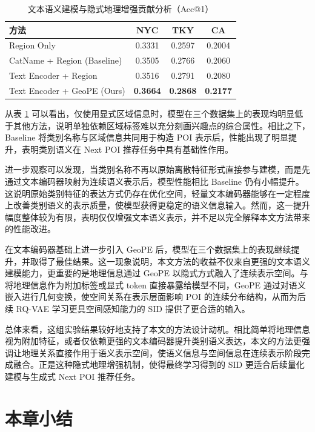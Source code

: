 \begin{table}[htbp]
\centering
\caption{文本语义建模与隐式地理增强贡献分析（Acc@1）}
\label{tab:ablation_textgeo}
\begin{tabular}{lccc}
\toprule
方法 & NYC & TKY & CA \\
\midrule
Region Only & 0.3331 & 0.2597 & 0.2004 \\
CatName + Region (Baseline) & 0.3505 & 0.2766 & 0.2060 \\
Text Encoder + Region & 0.3516 & 0.2791 & 0.2080 \\
Text Encoder + GeoPE (Ours) & \textbf{0.3664} & \textbf{0.2868} & \textbf{0.2177} \\
\bottomrule
\end{tabular}
\end{table}

从表 \ref{tab:ablation_textgeo} 可以看出，仅使用显式区域信息时，模型在三个数据集上的表现均明显低于其他方法，说明单独依赖区域标签难以充分刻画兴趣点的综合属性。相比之下，Baseline 将类别名称与区域信息共同用于构造 POI 表示后，性能出现了明显提升，表明类别语义在 Next POI 推荐任务中具有基础性作用。

进一步观察可以发现，当类别名称不再以原始离散特征形式直接参与建模，而是先通过文本编码器映射为连续语义表示后，模型性能相比 Baseline 仍有小幅提升。这说明原始类别特征的表达方式仍存在优化空间，轻量文本编码器能够在一定程度上改善类别语义的表示质量，使模型获得更稳定的语义信息输入。然而，这一提升幅度整体较为有限，表明仅仅增强文本语义表示，并不足以完全解释本文方法带来的性能改进。

在文本编码器基础上进一步引入 GeoPE 后，模型在三个数据集上的表现继续提升，并取得了最佳结果。这一现象说明，本文方法的收益不仅来自更强的文本语义建模能力，更重要的是地理信息通过 GeoPE 以隐式方式融入了连续表示空间。与将地理信息作为附加标签或显式 token 直接暴露给模型不同，GeoPE 通过对语义嵌入进行几何变换，使空间关系在表示层面影响 POI 的连续分布结构，从而为后续 RQ-VAE 学习更具空间感知能力的 SID 提供了更合适的输入。

总体来看，这组实验结果较好地支持了本文的方法设计动机。相比简单将地理信息视为附加特征，或者仅依赖更强的文本编码器提升类别语义表达，本文的方法更强调让地理关系直接作用于语义表示空间，使语义信息与空间信息在连续表示阶段完成融合。正是这种隐式地理增强机制，使得最终学习得到的 SID 更适合后续量化建模与生成式 Next POI 推荐任务。

\section{本章小结}
\label{sec:exp_summary}

